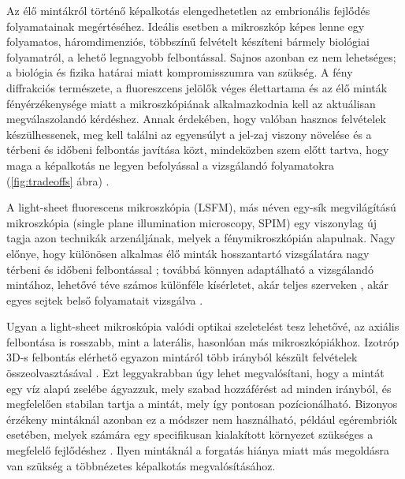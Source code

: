 \documentclass{booklet_style}
\begin{document}
Az élő mintákról történő képalkotás elengedhetetlen az embrionális fejlődés folyamatainak megértéséhez. Ideális esetben a mikroszkóp képes lenne egy folyamatos, háromdimenziós, többszínű felvételt készíteni bármely biológiai folyamatról, a lehető legnagyobb felbontással. Sajnos azonban ez nem lehetséges; a biológia és fizika határai miatt kompromisszumra van szükség. A fény diffrakciós természete, a fluoreszcens jelölők véges élettartama és az élő minták fényérzékenysége miatt a mikroszkópiának alkalmazkodnia kell az aktuálisan megválaszolandó kérdéshez. Annak érdekében, hogy valóban hasznos felvételek készülhessenek, meg kell találni az egyensúlyt a jel-zaj viszony növelése és a térbeni és időbeni felbontás javítása közt, mindeközben szem előtt tartva, hogy maga a képalkotás ne legyen befolyással a vizsgálandó folyamatokra (\ref{fig:tradeoffs} ábra) \cite{laissue_assessing_2017}.

A light-sheet fluorescens mikroszkópia (LSFM), más néven egy-sík megvilágítású mikroszkópia (single plane illumination microscopy, SPIM) \cite{huisken_optical_2004} egy viszonylag új tagja azon technikák arzenáljának, melyek a fénymikroszkópián alapulnak. Nagy előnye, hogy különösen alkalmas élő minták hosszantartó vizsgálatára nagy térbeni és időbeni felbontással \cite{keller_quantitative_2008, huisken_selective_2009, weber_light_2011,tomer_shedding_2011}; továbbá könnyen adaptálható a vizsgálandó mintához, lehetővé téve számos különféle kísérletet, akár teljes szerveken \cite{dodt_ultramicroscopy:_2007}, akár egyes sejtek belső folyamatait vizsgálva \cite{chen_lattice_2014}.

Ugyan a light-sheet mikroskópia valódi optikai szeletelést tesz lehetővé, az axiális felbontása is rosszabb, mint a laterális, hasonlóan más mikroszkópiákhoz.
Izotróp 3D-s felbontás elérhető egyazon mintáról több irányból készült felvételek összeolvasztásával \cite{preibisch_efficient_2014}. Ezt leggyakrabban úgy lehet megvalósítani, hogy a mintát egy víz alapú zselébe ágyazzuk, mely szabad hozzáférést ad minden irányból, és megfelelően stabilan tartja a mintát, mely így pontosan pozícionálható. Bizonyos érzékeny mintáknál azonban ez a módszer nem használható, például egérembriók esetében, melyek számára egy specifikusan kialakított környezet szükséges a megfelelő fejlődéshez \cite{doherty_culture_2000}. Ilyen mintáknál a forgatás hiánya miatt más megoldásra van szükség a többnézetes képalkotás megvalósításához.
\end{document}
